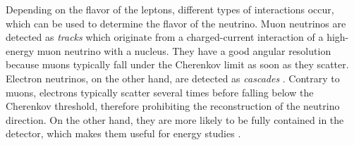 Depending on the flavor of the leptons,
different types of interactions occur,
which can be used to determine the flavor of the neutrino.
%
%
%
Muon neutrinos are detected as \emph{tracks} \cite{icecube_aartsen}
  which originate from a charged-current interaction of a high-energy muon neutrino with a nucleus.
They have a good angular resolution
  because muons typically fall under the Cherenkov limit as soon as they scatter.
%
%
Electron neutrinos,
  on the other hand,
are detected as \emph{cascades} \cite{icecube_aartsen}.
Contrary to muons,
  electrons typically scatter several times before falling below the Cherenkov threshold,
    therefore prohibiting the reconstruction of the neutrino direction.
On the other hand,
  they are more likely to be fully contained in the detector,
    which makes them useful for energy studies \cite{icecube_aartsen}.
%
